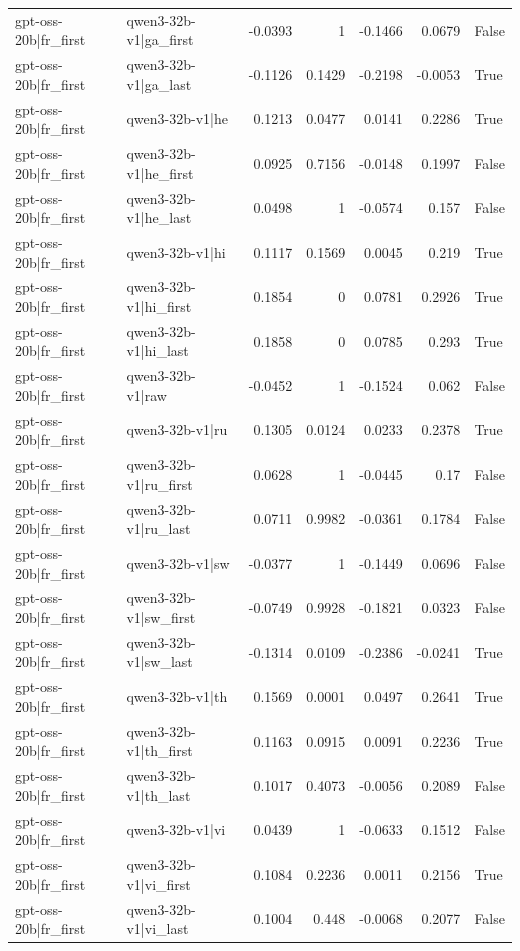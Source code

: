 \begin{table}
\begin{tabular}{l l r r r r l}
gpt-oss-20b|fr_first & qwen3-32b-v1|ga_first & -0.0393 & 1 & -0.1466 & 0.0679 & False \\
gpt-oss-20b|fr_first & qwen3-32b-v1|ga_last & -0.1126 & 0.1429 & -0.2198 & -0.0053 & True \\
gpt-oss-20b|fr_first & qwen3-32b-v1|he & 0.1213 & 0.0477 & 0.0141 & 0.2286 & True \\
gpt-oss-20b|fr_first & qwen3-32b-v1|he_first & 0.0925 & 0.7156 & -0.0148 & 0.1997 & False \\
gpt-oss-20b|fr_first & qwen3-32b-v1|he_last & 0.0498 & 1 & -0.0574 & 0.157 & False \\
gpt-oss-20b|fr_first & qwen3-32b-v1|hi & 0.1117 & 0.1569 & 0.0045 & 0.219 & True \\
gpt-oss-20b|fr_first & qwen3-32b-v1|hi_first & 0.1854 & 0 & 0.0781 & 0.2926 & True \\
gpt-oss-20b|fr_first & qwen3-32b-v1|hi_last & 0.1858 & 0 & 0.0785 & 0.293 & True \\
gpt-oss-20b|fr_first & qwen3-32b-v1|raw & -0.0452 & 1 & -0.1524 & 0.062 & False \\
gpt-oss-20b|fr_first & qwen3-32b-v1|ru & 0.1305 & 0.0124 & 0.0233 & 0.2378 & True \\
gpt-oss-20b|fr_first & qwen3-32b-v1|ru_first & 0.0628 & 1 & -0.0445 & 0.17 & False \\
gpt-oss-20b|fr_first & qwen3-32b-v1|ru_last & 0.0711 & 0.9982 & -0.0361 & 0.1784 & False \\
gpt-oss-20b|fr_first & qwen3-32b-v1|sw & -0.0377 & 1 & -0.1449 & 0.0696 & False \\
gpt-oss-20b|fr_first & qwen3-32b-v1|sw_first & -0.0749 & 0.9928 & -0.1821 & 0.0323 & False \\
gpt-oss-20b|fr_first & qwen3-32b-v1|sw_last & -0.1314 & 0.0109 & -0.2386 & -0.0241 & True \\
gpt-oss-20b|fr_first & qwen3-32b-v1|th & 0.1569 & 0.0001 & 0.0497 & 0.2641 & True \\
gpt-oss-20b|fr_first & qwen3-32b-v1|th_first & 0.1163 & 0.0915 & 0.0091 & 0.2236 & True \\
gpt-oss-20b|fr_first & qwen3-32b-v1|th_last & 0.1017 & 0.4073 & -0.0056 & 0.2089 & False \\
gpt-oss-20b|fr_first & qwen3-32b-v1|vi & 0.0439 & 1 & -0.0633 & 0.1512 & False \\
gpt-oss-20b|fr_first & qwen3-32b-v1|vi_first & 0.1084 & 0.2236 & 0.0011 & 0.2156 & True \\
gpt-oss-20b|fr_first & qwen3-32b-v1|vi_last & 0.1004 & 0.448 & -0.0068 & 0.2077 & False \\

\end{tabular}
\end{table}
